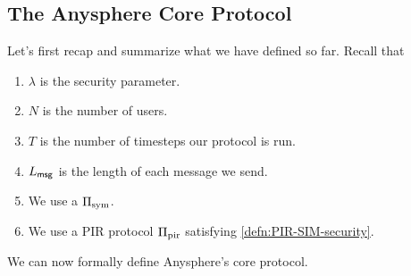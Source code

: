 \subsection{The Anysphere Core Protocol}
Let's first recap and summarize what we have defined so far. Recall that
\begin{enumerate}
    \item $\lambda$ is the security parameter.
    \item $N$ is the number of users.
    \item $T$ is the number of timesteps our protocol is run.
    \item $L_{\mathsf{msg}}$ is the length of each message we send.
    \item We use a  $\Pi_{\text{sym}}$.
    \item We use a PIR protocol $\Pi_{\text{pir}}$ satisfying \cref{defn:PIR-SIM-security}.
\end{enumerate}
We can now formally define Anysphere's core protocol.
